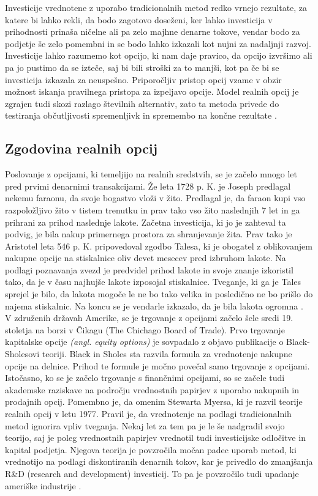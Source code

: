 Investicije vrednotene z uporabo tradicionalnih metod redko vrnejo rezultate, za katere bi lahko rekli, da bodo zagotovo doseženi, ker lahko investicija v prihodnosti prinaša ničelne ali pa zelo majhne denarne tokove, vendar bodo za podjetje še zelo pomembni in se bodo lahko izkazali kot nujni za nadaljnji razvoj. Investicije lahko razumemo kot opcijo, ki nam daje pravico, da opcijo izvršimo ali pa jo pustimo da se izteče, saj bi bili stroški za to manjši, kot pa če bi se investicija izkazala za neuspešno. Priporočljiv pristop opcij vzame v obzir možnost iskanja pravilnega pristopa za izpeljavo opcije. Model realnih opcij je zgrajen tudi skozi razlago številnih alternativ, zato ta metoda privede do testiranja občutljivosti spremenljivk in spremembo na končne rezultate \cite[str. 93, 94]{Mun}. \\

\subsection{Zgodovina realnih opcij}
Poslovanje z opcijami, ki temeljijo na realnih sredstvih, se je začelo mnogo let pred prvimi denarnimi transakcijami. Že leta 1728 p. K. je Joseph predlagal nekemu faraonu, da svoje bogastvo vloži v žito. Predlagal je, da faraon kupi vso razpoložljivo žito v tistem trenutku in prav tako vso žito naslednjih 7 let in ga prihrani za prihod naslednje lakote. Začetna investicija, ki jo je zahteval ta podvig, je bila nakup primernega prostora za shranjevanje žita. Prav tako je Aristotel leta 546 p. K. pripovedoval zgodbo Talesa, ki je obogatel z oblikovanjem nakupne opcije na stiskalnice oliv devet mesecev pred izbruhom lakote. Na podlagi poznavanja zvezd je predvidel prihod lakote in svoje znanje izkoristil tako, da je v času najhujše lakote izposojal stiskalnice. Tveganje, ki ga je Tales sprejel je bilo, da lakota mogoče le ne bo tako velika in posledično ne bo prišlo do najema stiskalnic. Na koncu se je vendarle izkazalo, da je bila lakota ogromna \cite[str. 13]{Brach}. \\

V združenih državah Amerike, se je trgovanje z opcijami začelo šele sredi 19. stoletja na borzi v Čikagu (The Chichago Board of Trade). Prvo trgovanje kapitalske opcije \textit{(angl. equity options)} je sovpadalo z objavo publikacije o Black-Sholesovi teoriji. Black in Sholes sta razvila formula za vrednotenje nakupne opcije na delnice. Prihod te formule je močno povečal samo trgovanje z opcijami. Istočasno, ko se je začelo trgovanje s finančnimi opcijami, so se začele tudi akademske raziskave na področju vrednostnih papirjev z uporabo nakupnih in prodajnih opcij. Pomembno je, da omenim Stewarta Myersa, ki je razvil teorije realnih opcij v letu 1977. Pravil je, da vrednotenje na podlagi tradicionalnih metod ignorira vpliv tveganja. Nekaj let za tem pa je le še nadgradil svojo teorijo, saj je poleg vrednostnih papirjev vrednotil tudi investicijske odločitve in kapital podjetja. Njegova teorija je povzročila močan padec uporab metod, ki vrednotijo na podlagi diskontiranih denarnih tokov, kar je privedlo do zmanjšanja R\&D (research and development) investicij. To pa je povzročilo tudi upadanje ameriške industrije \cite[str. 14, 15]{Brach}.  \\

